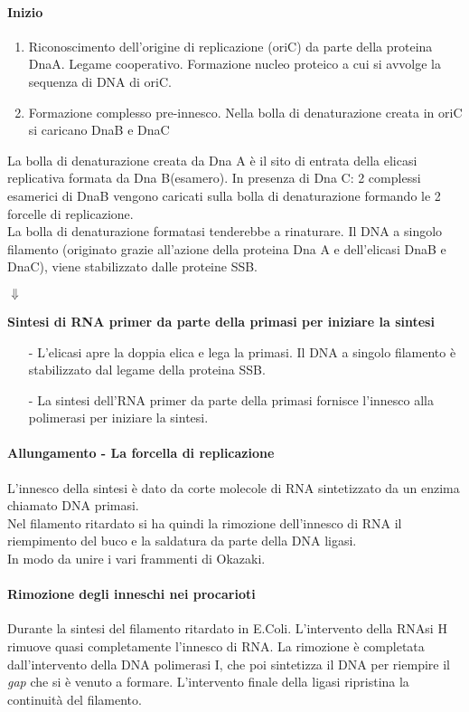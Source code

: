 \documentclass{article}
\begin{document}
\paragraph{Inizio}
\begin{enumerate}
    \item Riconoscimento dell'origine di replicazione (oriC) da parte della proteina DnaA. 
    Legame cooperativo. Formazione nucleo proteico a cui si avvolge la sequenza di DNA di oriC.
    \item Formazione complesso pre-innesco.
    Nella bolla di denaturazione creata in oriC si caricano DnaB e DnaC
\end{enumerate}
La bolla di denaturazione creata da Dna A è il sito di entrata della elicasi replicativa formata da Dna B(esamero).
In presenza di Dna C: 2 complessi esamerici di DnaB vengono caricati sulla bolla di denaturazione formando le 2 forcelle di replicazione.\\
La bolla di denaturazione formatasi tenderebbe a rinaturare. Il DNA a singolo filamento (originato grazie all'azione della proteina Dna A e dell'elicasi DnaB e DnaC), viene stabilizzato dalle proteine SSB.\\
\begin{center}
    \textbf{}{$\Downarrow$}
\end{center}
\textbf{Sintesi di RNA primer da parte della primasi per iniziare la sintesi}
\begin{itemize}
    \item [-] L'elicasi apre la doppia elica e lega la primasi. Il DNA a singolo filamento è stabilizzato dal legame della proteina SSB.\\
    \item [-] La sintesi dell'RNA primer da parte della primasi fornisce l'innesco alla polimerasi per iniziare la sintesi.
\end{itemize}
\paragraph{Allungamento - La forcella di replicazione}  
L'innesco della sintesi è dato da corte molecole di RNA sintetizzato da un enzima chiamato DNA primasi.\\
Nel filamento ritardato si ha quindi la rimozione dell'innesco di RNA il riempimento del buco e la saldatura da parte della DNA ligasi.\\
In modo da unire i vari frammenti di Okazaki.
\paragraph{Rimozione degli inneschi nei procarioti} Durante la sintesi del filamento ritardato in E.Coli. 
L'intervento della RNAsi H rimuove quasi completamente l'innesco di RNA. La rimozione è completata dall'intervento della DNA polimerasi I,
che poi sintetizza il DNA per riempire il \textit{gap} che si è venuto a formare.
L'intervento finale della ligasi ripristina la continuità del filamento.
\end{document}
